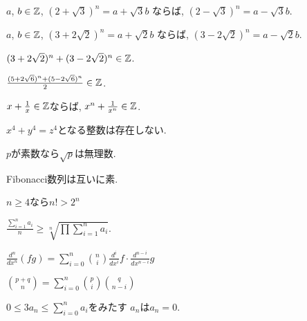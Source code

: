 \begin{prop}
  $a$, $b\in\mathbb{Z}$,  
  $(2+\sqrt{3})^n=a+\sqrt{3}b$
  ならば,
  $(2-\sqrt{3})^n=a-\sqrt{3}b$.
\end{prop}

\begin{prop}
  $a$, $b\in\mathbb{Z}$,  
  $(3+2\sqrt{2})^n=a+\sqrt{2}b$
  ならば,
  $(3-2\sqrt{2})^n=a-\sqrt{2}b$.
\end{prop}


\begin{prop}
  $(3+2\sqrt{2})^n+(3-2\sqrt{2})^n\in\mathbb{Z}$.
\end{prop}

\begin{prop}
  $\frac{(5+2\sqrt{6})^n+(5-2\sqrt{6})^n}{2}\in\mathbb{Z}$.
\end{prop}

\begin{prop}
  $x+\frac{1}{x}\in\mathbb{Z}$ならば, 
  $x^n+\frac{1}{x^n}\in\mathbb{Z}$.
\end{prop}


\begin{prop}
  $x^4+y^4=z^4$となる整数は存在しない.
\end{prop}

\begin{prop}
  $p$が素数なら$\sqrt{p}$は無理数.
\end{prop}

\begin{prop}
  Fibonacci数列は互いに素.
\end{prop}



\begin{prop}
  $n\geq 4$なら$n!>2^n$
\end{prop}



\begin{prop}
  $\frac{\sum_{i=1}^n a_i}{n} \geq \sqrt[n]{\prod\sum_{i=1}^n a_i}$.
\end{prop}


\begin{prop}
$\frac{d^n}{dx^n}(fg)=\sum_{i=0}^n\binom{n}{i}\frac{d^i}{dx^i}f \cdot \frac{d^{n-i}}{dx^{n-i}}g$
\end{prop}


\begin{prop}
$\binom{p+q}{n}=\sum_{i=0}^n\binom{p}{i}\binom{q}{n-i}$
\end{prop}


\begin{prop}
  $0\leq 3a_n\leq\sum_{i=0}^n a_i$をみたす
  $a_n$は$a_n=0$.
\end{prop}

